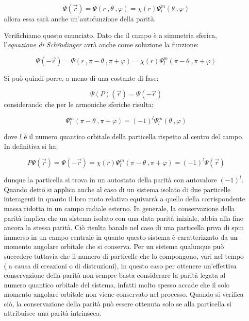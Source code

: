 \begin{equation*}
\Psi(\vec{r}) = \Psi ( r \ , \theta \ , \varphi) = \chi(r) \Psi^m_l (\theta \ , 
\varphi)
\end{equation*}
allora essa sarà anche un'autofunzione della parità. 

Verifichiamo questo enunciato.
Dato che il campo è a simmetria sferica, l'\textit{equazione di
  Schr$\ddot{o}$dinger} avrà anche come soluzione la funzione:

\begin{equation*}
\Psi(-\vec{r}) = \Psi ( r \ , \pi-\theta \ , \pi+\varphi) = \chi(r) \Psi^m_l 
(\pi-\theta \ , \pi+\varphi)
\end{equation*}

Si può quindi porre, a meno di una costante di fase:

\begin{equation*}
\Psi(P)(\vec{r}) = \Psi (-\vec{r})
\end{equation*}
considerando che per le armoniche sferiche risulta:

\begin{equation*}
\Psi^m_l (\pi-\theta \ , \pi+\varphi) = (-1)^l \Psi^m_l(\theta \ , \varphi)
\end{equation*}

dove $l$ è il numero quantico orbitale della particella rispetto al centro del
campo. In definitiva si ha:

\begin{equation*}
P \Psi(\vec{r})= \Psi (-\vec{r}) = \chi (r) \Psi^m_l (\pi - \theta \ , 
\pi+\varphi) = (-1)^l \Psi(\vec{r})
\end{equation*}

dunque la particella si trova in un autostato della parità con autovalore 
$(-1)^l$.
Quando detto si applica anche al caso di un sistema isolato di due particelle
interagenti in quanto il loro moto relativo equivarrà a quello della
corrispondente massa ridotta in un campo radiale esterno. In generale, la
conservazione della parità implica che un sistema isolato con una data parità
iniziale, abbia alla fine ancora la stessa parità. Ciò risulta banale nel caso
di una particella priva di spin immerso in un campo centrale in quanto questo
sistema è caratterizzato da un momento angolare orbitale che si conserva. Per 
un
sistema qualunque può succedere tuttavia che il numero di particelle che lo
compongono, vari nel tempo ( a causa di creazioni o di distruzioni), in questo
caso per ottenere un'effettiva conservazione della parità non sempre basta
considerare la parità legata al numero quantico orbitale del sistema, infatti
molto spesso accade che il solo momento angolare orbitale non viene conservato
nel processo. Quando si verifica ciò, la conservazione della parità può 
essere
ottenuta solo se alla particella si attribuisce una parità intrinseca.
